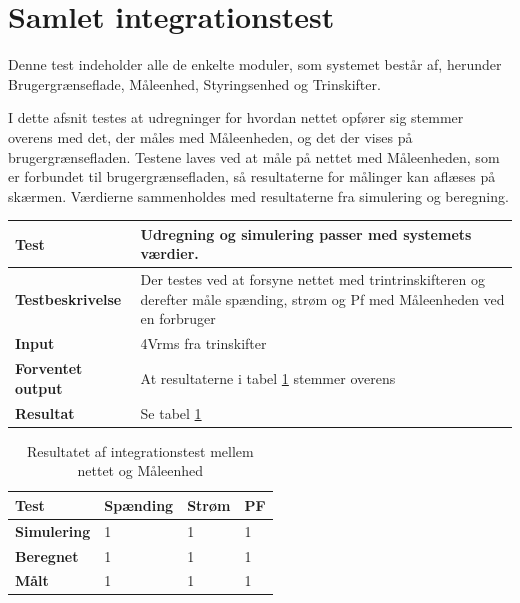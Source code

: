 
\section{Samlet integrationstest}
Denne test indeholder alle de enkelte moduler, som systemet består af, herunder Brugergrænseflade, Måleenhed, Styringsenhed og Trinskifter. 

I dette afsnit testes at udregninger for hvordan nettet opfører sig stemmer overens med det, der måles med Måleenheden, og det der vises på brugergrænsefladen.
Testene laves ved at måle på nettet med Måleenheden, som er forbundet til brugergrænsefladen, så resultaterne for målinger kan aflæses på skærmen. Værdierne sammenholdes med resultaterne fra simulering og beregning. 



\begin{center}
	\begin{tabular}{ | m{} | m{}|} 
		\hline
		\textbf{Test}					&Udregning og simulering passer med systemets værdier. \\ \hline
		\textbf{Testbeskrivelse}		&Der testes ved at forsyne nettet med trintrinskifteren og derefter måle spænding, strøm og Pf med Måleenheden ved en forbruger \\ \hline
		\textbf{Input}					&4Vrms fra trinskifter \\ \hline
		\textbf{Forventet output}		&At resultaterne i tabel \ref{tab:intTest2} stemmer overens \\ \hline
		\textbf{Resultat}				&Se tabel \ref{tab:intTest2} \\ \hline
	\end{tabular}
\end{center}


\begin{table}[H]
	\begin{tabular}{ | m{} | m{} | m{} | m{}|}  
		\hline
		\textbf{Test}			& \textbf{Spænding} & \textbf{Strøm}  	& \textbf{PF}			\\ \hline
		\textbf{Simulering}		&1					&1				  	&1 					\\ \hline
		\textbf{Beregnet}		&1 					&1					&1					\\ \hline
		\textbf{Målt}			&1 					&1					&1					\\ \hline
	\end{tabular}
	\caption{Resultatet af integrationstest mellem nettet og Måleenhed}
	\label{tab:intTest2}
\end{table}

